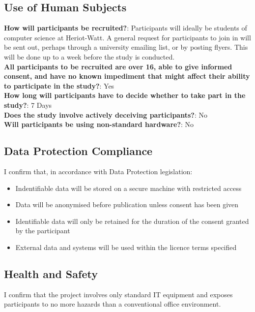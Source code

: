 \documentclass[a4paper,11pt]{report}
\begin{document}
\subsection*{Use of Human Subjects}
\textbf{How will participants be recruited?}: Participants will ideally be students of computer science at Heriot-Watt. A general request for participants to join in will be sent out, perhaps through a university emailing list, or by posting flyers. This will be done up to a week before the study is conducted.\\
\textbf{All participants to be recruited are over 16, able to give informed consent, and have no known impediment that might affect their ability to participate in the study?}: Yes\\
\textbf{How long will participants have to decide whether to take part in the study?}: 7 Days\\
\textbf{Does the study involve actively deceiving participants?}: No\\
\textbf{Will participants be using non-standard hardware?}: No

\subsection*{Data Protection Compliance}
I confirm that, in accordance with Data Protection legislation:
\begin{itemize}
\item Indentifiable data will be stored on a secure machine with restricted access
\item Data will be anonymised before publication unless consent has been given
\item Identifiable data will only be retained for the duration of the consent granted by the participant
\item External data and systems will be used within the licence terms specified
\end{itemize}

\subsection*{Health and Safety}
I confirm that the project involves only standard IT equipment and exposes participants to no more hazards than a conventional office environment.

\newpage
{}
\label{app:consent}


\end{document}

